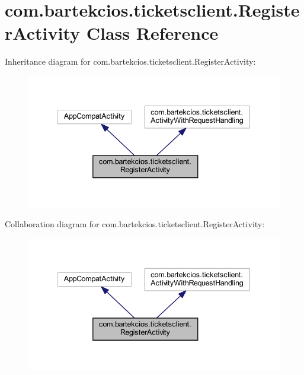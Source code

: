 \hypertarget{classcom_1_1bartekcios_1_1ticketsclient_1_1_register_activity}{}\section{com.\+bartekcios.\+ticketsclient.\+Register\+Activity Class Reference}
\label{classcom_1_1bartekcios_1_1ticketsclient_1_1_register_activity}


Inheritance diagram for com.\+bartekcios.\+ticketsclient.\+Register\+Activity\+:
\nopagebreak
\begin{figure}[H]
\begin{center}
\leavevmode
\includegraphics[width=340pt]{classcom_1_1bartekcios_1_1ticketsclient_1_1_register_activity__inherit__graph}
\end{center}
\end{figure}


Collaboration diagram for com.\+bartekcios.\+ticketsclient.\+Register\+Activity\+:
\nopagebreak
\begin{figure}[H]
\begin{center}
\leavevmode
\includegraphics[width=340pt]{classcom_1_1bartekcios_1_1ticketsclient_1_1_register_activity__coll__graph}
\end{center}
\end{figure}
